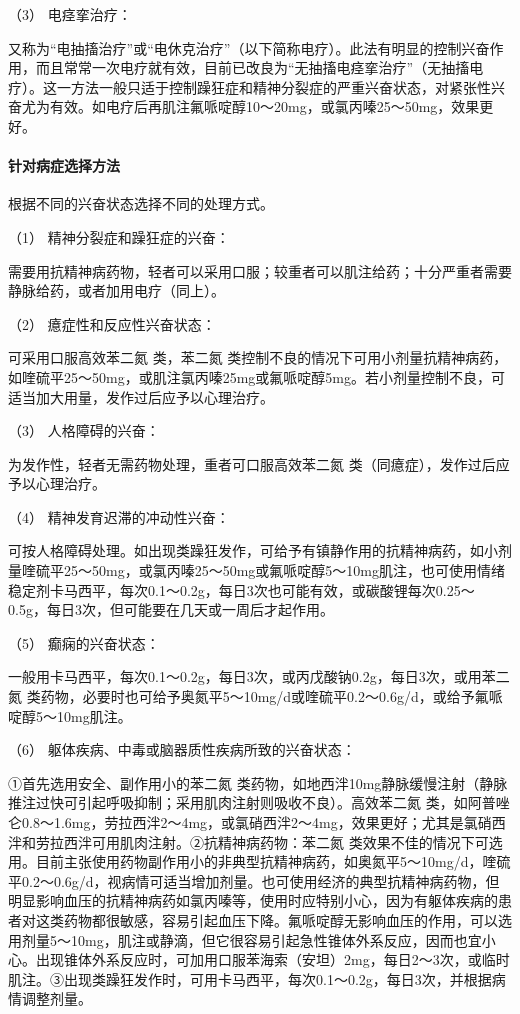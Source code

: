 \hypertarget{text00043.htmlux5cux23CHP1-18-1-3-1-3}{}
（3） 电痉挛治疗：

又称为“电抽搐治疗”或“电休克治疗”（以下简称电疗）。此法有明显的控制兴奋作用，而且常常一次电疗就有效，目前已改良为“无抽搐电痉挛治疗”（无抽搐电疗）。这一方法一般只适于控制躁狂症和精神分裂症的严重兴奋状态，对紧张性兴奋尤为有效。如电疗后再肌注氟哌啶醇10～20mg，或氯丙嗪25～50mg，效果更好。

\paragraph{针对病症选择方法}

根据不同的兴奋状态选择不同的处理方式。

\hypertarget{text00043.htmlux5cux23CHP1-18-1-3-2-1}{}
（1） 精神分裂症和躁狂症的兴奋：

需要用抗精神病药物，轻者可以采用口服；较重者可以肌注给药；十分严重者需要静脉给药，或者加用电疗（同上）。

\hypertarget{text00043.htmlux5cux23CHP1-18-1-3-2-2}{}
（2） 癔症性和反应性兴奋状态：

可采用口服高效苯二氮{} 类，苯二氮{}
类控制不良的情况下可用小剂量抗精神病药，如喹硫平25～50mg，或肌注氯丙嗪25mg或氟哌啶醇5mg。若小剂量控制不良，可适当加大用量，发作过后应予以心理治疗。

\hypertarget{text00043.htmlux5cux23CHP1-18-1-3-2-3}{}
（3） 人格障碍的兴奋：

为发作性，轻者无需药物处理，重者可口服高效苯二氮{}
类（同癔症），发作过后应予以心理治疗。

\hypertarget{text00043.htmlux5cux23CHP1-18-1-3-2-4}{}
（4） 精神发育迟滞的冲动性兴奋：

可按人格障碍处理。如出现类躁狂发作，可给予有镇静作用的抗精神病药，如小剂量喹硫平25～50mg，或氯丙嗪25～50mg或氟哌啶醇5～10mg肌注，也可使用情绪稳定剂卡马西平，每次0.1～0.2g，每日3次也可能有效，或碳酸锂每次0.25～0.5g，每日3次，但可能要在几天或一周后才起作用。

\hypertarget{text00043.htmlux5cux23CHP1-18-1-3-2-5}{}
（5） 癫痫的兴奋状态：

一般用卡马西平，每次0.1～0.2g，每日3次，或丙戊酸钠0.2g，每日3次，或用苯二氮{}
类药物，必要时也可给予奥氮平5～10mg/d或喹硫平0.2～0.6g/d，或给予氟哌啶醇5～10mg肌注。

\hypertarget{text00043.htmlux5cux23CHP1-18-1-3-2-6}{}
（6） 躯体疾病、中毒或脑器质性疾病所致的兴奋状态：

①首先选用安全、副作用小的苯二氮{}
类药物，如地西泮10mg静脉缓慢注射（静脉推注过快可引起呼吸抑制；采用肌肉注射则吸收不良）。高效苯二氮{}
类，如阿普唑仑0.8～1.6mg，劳拉西泮2～4mg，或氯硝西泮2～4mg，效果更好；尤其是氯硝西泮和劳拉西泮可用肌肉注射。②抗精神病药物：苯二氮{}
类效果不佳的情况下可选用。目前主张使用药物副作用小的非典型抗精神病药，如奥氮平5～10mg/d，喹硫平0.2～0.6g/d，视病情可适当增加剂量。也可使用经济的典型抗精神病药物，但明显影响血压的抗精神病药如氯丙嗪等，使用时应特别小心，因为有躯体疾病的患者对这类药物都很敏感，容易引起血压下降。氟哌啶醇无影响血压的作用，可以选用剂量5～10mg，肌注或静滴，但它很容易引起急性锥体外系反应，因而也宜小心。出现锥体外系反应时，可加用口服苯海索（安坦）2mg，每日2～3次，或临时肌注。③出现类躁狂发作时，可用卡马西平，每次0.1～0.2g，每日3次，并根据病情调整剂量。

